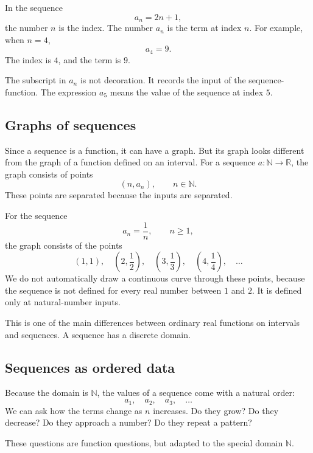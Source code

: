 In the sequence
\[
a_n=2n+1,
\]
the number \(n\) is the index. The number \(a_n\) is the term at index \(n\). For example, when \(n=4\),
\[
a_4=9.
\]
The index is \(4\), and the term is \(9\).

\begin{remarkbox}
The subscript in \(a_n\) is not decoration. It records the input of the sequence-function. The expression \(a_5\) means the value of the sequence at index \(5\).
\end{remarkbox}

\subsection*{Graphs of sequences}

Since a sequence is a function, it can have a graph. But its graph looks different from the graph of a function defined on an interval. For a sequence \(a:\mathbb{N}\to\mathbb{R}\), the graph consists of points
\[
(n,a_n),
\qquad n\in\mathbb{N}.
\]
These points are separated because the inputs are separated.

\begin{examplebox}
For the sequence
\[
a_n=\frac1n,
\qquad n\ge1,
\]
the graph consists of the points
\[
\left(1,1\right),
\quad
\left(2,\frac12\right),
\quad
\left(3,\frac13\right),
\quad
\left(4,\frac14\right),
\quad\ldots
\]
We do not automatically draw a continuous curve through these points, because the sequence is not defined for every real number between \(1\) and \(2\). It is defined only at natural-number inputs.
\end{examplebox}

This is one of the main differences between ordinary real functions on intervals and sequences. A sequence has a discrete domain.

\subsection*{Sequences as ordered data}

Because the domain is \(\mathbb{N}\), the values of a sequence come with a natural order:
\[
a_1,
\quad
a_2,
\quad
a_3,
\quad\ldots
\]
We can ask how the terms change as \(n\) increases. Do they grow? Do they decrease? Do they approach a number? Do they repeat a pattern?

These questions are function questions, but adapted to the special domain \(\mathbb{N}\).

